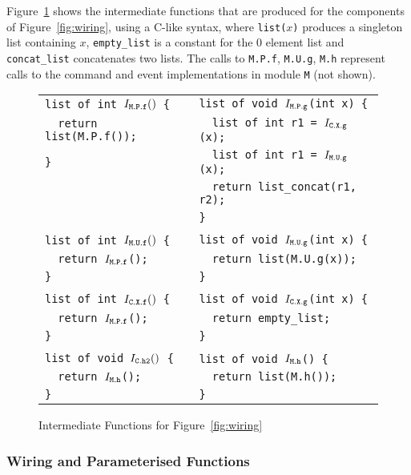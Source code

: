 \documentclass[11pt,letterpaper]{article}
\newcommand{\code}[1]{{\tt #1}}
\begin{document}
Figure~\ref{fig:wiring-fns} shows the intermediate functions that are
produced for the components of Figure~\ref{fig:wiring}, using a C-like
syntax, where \code{list($x$)} produces a singleton list containing $x$,
\code{empty\_list} is a constant for the 0 element list and
\code{concat\_list} concatenates two lists. The calls to \code{M.P.f},
\code{M.U.g}, \code{M.h} represent calls to the command and event
implementations in module \code{M} (not shown).

\begin{figure}
\begin{tabular}{ll}
\tt list of int $I_\code{M.P.f}()$ \{ & \tt list of void $I_\code{M.P.g}$(int x) \{ \\
\tt \ \ return list(M.P.f());         & \tt \ \ list of int r1 = $I_\code{C.X.g}$(x); \\
\tt \}                                & \tt \ \ list of int r1 = $I_\code{M.U.g}$(x); \\
                                      & \tt \ \ return list\_concat(r1, r2); \\
                                      & \tt \} \\
\\
\tt list of int $I_\code{M.U.f}()$ \{ & \tt list of void $I_\code{M.U.g}$(int x) \{ \\
\tt \ \ return $I_\code{M.P.f}$();    & \tt \ \ return list(M.U.g(x)); \\
\tt \}                                & \tt \} \\
\\
\tt list of int $I_\code{C.X.f}()$ \{ & \tt list of void $I_\code{C.X.g}$(int x) \{ \\
\tt \ \ return $I_\code{M.P.f}$();    & \tt \ \ return empty\_list; \\
\tt \}                                & \tt \} \\
\\
\tt list of void $I_\code{C.h2}()$ \{ & \tt list of void $I_\code{M.h}$() \{ \\
\tt \ \ return $I_\code{M.h}$();      & \tt \ \ return list(M.h()); \\
\tt \}                                & \tt \} \\
\end{tabular}
\caption{Intermediate Functions for Figure~\ref{fig:wiring}}
\label{fig:wiring-fns}
\end{figure}

\subsubsection{Wiring and Parameterised Functions}
\label{sec:wiring-parms}
\end{document}
